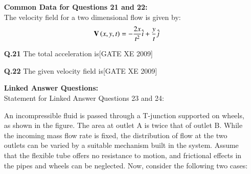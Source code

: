 \documentclass[journal,12pt,onecolumn]{IEEEtran}
\theoremstyle{remark}
\begin{document}
\begin{enumerate}
\textbf{Common Data for Questions 21 and 22:}\\
The velocity field for a two dimensional flow is given by:
$$
\mathbf{V}\left(x, y, t\right) = -\frac{2x}{t^2}\hat{i} + \frac{y}{t}\hat{j}
$$

\item[\textbf{Q.21}] The total acceleration is\hfill[GATE XE 2009]

\begin{enumerate}[leftmargin=*, itemsep=4pt]
\end{enumerate}

\vspace{0.3cm}

\item[\textbf{Q.22}] The given velocity field is\hfill[GATE XE 2009]

\begin{enumerate}[leftmargin=*, itemsep=4pt]
\end{enumerate}


\vspace{0.5cm}

\textbf{Linked Answer Questions:}\\
Statement for Linked Answer Questions 23 and 24:

An incompressible fluid is passed through a T-junction supported on wheels, as shown in the figure. The area at outlet A is twice that of outlet B. While the incoming mass flow rate is fixed, the distribution of flow at the two outlets can be varied by a suitable mechanism built in the system. Assume that the flexible tube offers no resistance to motion, and frictional effects in the pipes and wheels can be neglected. Now, consider the following two cases:


\end{enumerate}
\end{document}
